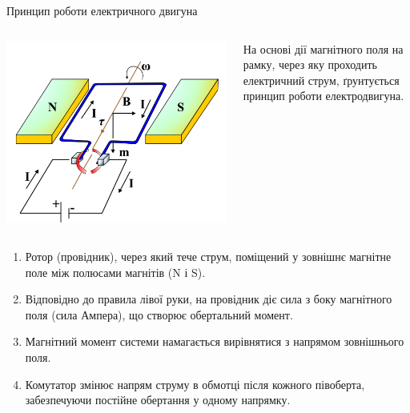 \documentclass{beamer}
\begin{document}
\begin{frame}{Принцип роботи електричного двигуна}{}

	\begin{columns}
		\begin{column}{0.4\linewidth}\centering\scriptsize
			\includegraphics[width=1\linewidth]{motor}
		\end{column}
		\begin{column}{0.6\linewidth}
			\begin{block}{}\justifying
				На основі дії магнітного поля на рамку, через яку проходить електричний струм, ґрунтується принцип роботи електродвигуна.
			\end{block}
		\end{column}
	\end{columns}
	\begin{block}{}\scriptsize
		\begin{enumerate}
			\item Ротор (провідник), через який тече струм, поміщений у зовнішнє магнітне поле між полюсами магнітів (N і S).
			\item Відповідно до правила лівої руки, на провідник діє сила з боку магнітного поля (сила Ампера), що створює обертальний момент.
			\item Магнітний момент системи намагається вирівнятися з напрямом зовнішнього поля.
			\item Комутатор змінює напрям струму в обмотці після кожного півоберта, забезпечуючи постійне обертання у одному напрямку.
		\end{enumerate}
	\end{block}
\end{frame}
\end{document}
